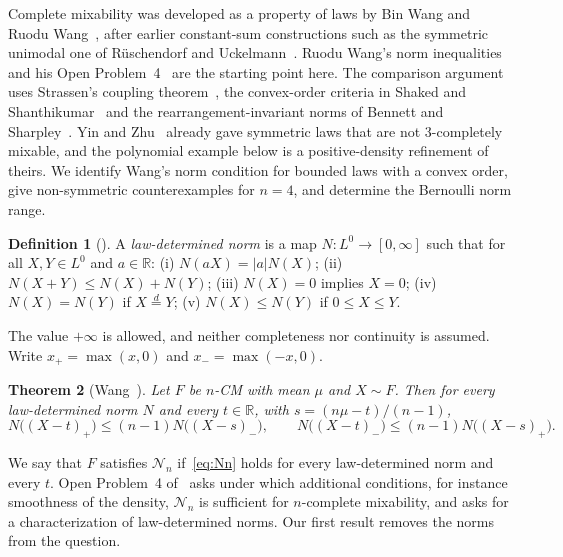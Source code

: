 \documentclass[11pt]{amsart}
\newtheorem{theorem}{Theorem}[section]
\theoremstyle{definition}
\newtheorem{definition}[theorem]{Definition}
\newcommand{\R}{\mathbb{R}}
\newcommand{\eqd}{\stackrel{d}{=}}
\newcommand{\cN}{\mathcal{N}}
\begin{document}
Complete mixability was developed as a property of laws by Bin Wang and Ruodu Wang~\cite{WW11}, after earlier
constant-sum constructions such as the symmetric unimodal one of R\"uschendorf and Uckelmann~\cite{RU02}. Ruodu Wang's
norm inequalities and his Open Problem~4~\cite{W15} are the starting point here. The comparison argument uses
Strassen's coupling theorem~\cite{Str65}, the convex-order criteria in Shaked and Shanthikumar~\cite{SS07} and the
rearrangement-invariant norms of Bennett and Sharpley~\cite{BS88}. Yin and Zhu~\cite{YZ} already gave symmetric laws
that are not $3$-completely mixable, and the polynomial example below is a positive-density refinement of theirs. We
identify Wang's norm condition for bounded laws with a convex order, give non-symmetric counterexamples for $n=4$, and
determine the Bernoulli norm range.

\begin{definition}[{\cite[Definition~5]{W15}}]\label{def:norm}
A \emph{law-determined norm} is a map $N\colon L^0\to[0,\infty]$ such that for all $X,Y\in L^0$ and $a\in\R$:
(i) $N(aX)=|a|N(X)$; (ii) $N(X+Y)\le N(X)+N(Y)$; (iii) $N(X)=0$ implies $X=0$; (iv) $N(X)=N(Y)$ if $X\eqd Y$;
(v) $N(X)\le N(Y)$ if $0\le X\le Y$.
\end{definition}

The value $+\infty$ is allowed, and neither completeness nor continuity is assumed. Write $x_+=\max(x,0)$ and
$x_-=\max(-x,0)$.

\begin{theorem}[{Wang~\cite[Theorem~5]{W15}}]\label{thm:wang}
Let $F$ be $n$-CM with mean $\mu$ and $X\sim F$. Then for every law-determined norm $N$ and every $t\in\R$, with
$s=(n\mu-t)/(n-1)$,
\begin{equation}\label{eq:Nn}
N\bigl((X-t)_+\bigr)\le(n-1)N\bigl((X-s)_-\bigr),\qquad N\bigl((X-t)_-\bigr)\le(n-1)N\bigl((X-s)_+\bigr).
\end{equation}
\end{theorem}

We say that $F$ satisfies $\cN_n$ if~\eqref{eq:Nn} holds for every law-determined norm and every $t$. Open
Problem~4 of~\cite{W15} asks under which additional conditions, for instance smoothness of the density, $\cN_n$ is
sufficient for $n$-complete mixability, and asks for a characterization of law-determined norms. Our first result
removes the norms from the question.
\end{document}

